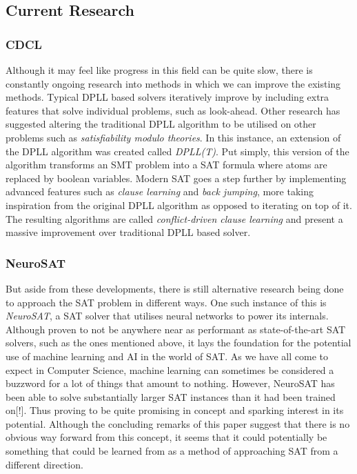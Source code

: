 \documentclass{article}
\begin{document}
\subsection{Current Research}
\subsubsection{CDCL}
Although it may feel like progress in this field can be quite slow, there is constantly ongoing research into methods in which we
can improve the existing methods. Typical DPLL based solvers iteratively improve by including extra features that solve individual
problems, such as look-ahead. Other research has suggested altering the traditional DPLL algorithm to be utilised on other
problems such as \textit{satisfiability modulo theories}. In this instance, an extension of the DPLL algorithm was created called
\textit{DPLL(T)}. Put simply, this version of the algorithm transforms an SMT problem into a SAT formula where atoms are replaced
by boolean variables. Modern SAT goes a step further by implementing advanced features such as \textit{clause learning} and
\textit{back jumping}, more taking inspiration from the original DPLL algorithm as opposed to iterating on top of it. The
resulting algorithms are called \textit{conflict-driven clause learning} and present a massive improvement over traditional DPLL
based solver.

\subsubsection{NeuroSAT}
But aside from these developments, there is still alternative research being done to approach the SAT problem in different ways.
One such instance of this is \textit{NeuroSAT}, a SAT solver that utilises neural networks to power its internals. Although proven
to not be anywhere near as performant as state-of-the-art SAT solvers, such as the ones mentioned above, it lays the foundation
for the potential use of machine learning and AI in the world of SAT. As we have all come to expect in Computer Science, machine
learning can sometimes be considered a buzzword for a lot of things that amount to nothing. However, NeuroSAT has been able to
solve substantially larger SAT instances than it had been trained on[!]. Thus proving to be quite promising in concept and
sparking interest in its potential. Although the concluding remarks of this paper suggest that there is no obvious way forward
from this concept, it seems that it could potentially be something that could be learned from as a method of approaching SAT from
a different direction.
\end{document}
